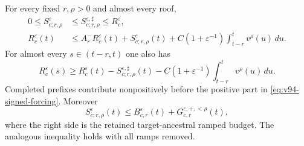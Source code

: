 \begin{theorem}
\label{thm:v94-signed-comparison}
For every fixed $r,\rho>0$ and almost every roof,
\begin{align}
 0\le S_{c;r,\rho}^\varepsilon
       &\le S_{c;r,\rho}^{\varepsilon,\sharp}\le R_c^\varepsilon,
                                            \label{eq:v94-forcing-domination}\\
 R_c^\varepsilon(t)
       &\le A_r^-R_c^\varepsilon(t)+S_{c;r,\rho}^\varepsilon(t)
         +C(1+\varepsilon^{-1})\int_{t-r}^t v^\rho(u)\,du.
                                            \label{eq:v94-signed-pointwise}
\end{align}
For almost every $s\in(t-r,t)$ one also has
\begin{equation}\label{eq:v94-signed-persistence}
 R_c^\varepsilon(s)\ge R_c^\varepsilon(t)
       -S_{c;r,\rho}^{\varepsilon,\sharp}(t)
       -C(1+\varepsilon^{-1})\int_{t-r}^t v^\rho(u)\,du.
\end{equation}
Completed prefixes contribute nonpositively before the positive part
in \eqref{eq:v94-signed-forcing}. Moreover
\begin{equation}\label{eq:v94-smaller-forcing}
 S_{c;r,\rho}^\varepsilon(t)
 \le B_{c,r}^\varepsilon(t)+G_{c,r}^{\varepsilon,+,<\rho}(t),
\end{equation}
where the right side is the retained target-ancestral ramped budget.
The analogous inequality holds with all ramps removed.
\end{theorem}
